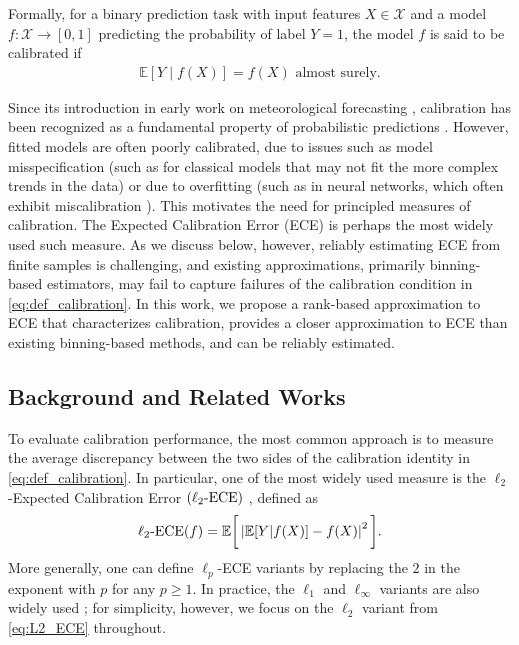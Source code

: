 \documentclass[11pt]{article}
\numberwithin{equation}{section}
\theoremstyle{definition}
\newcommand{\E}{\mathbb{E}}
\newcommand{\ECE}{\mathrm{ECE}}
\newcommand{\lECE}{\ell_2\textnormal{-}\ECE}
\begin{document}
Formally, for a binary prediction task with input features $X \in \mathcal{X}$ and a model $f:\mathcal{X} \rightarrow [0,1]$ predicting the probability of label $Y = 1$, the model $f$ is said to be calibrated if
\begin{align}\label{eq:def_calibration}
\mathbb{E}\left[Y \mid f(X)\right] = f(X)\text{ almost surely.}
\end{align}

Since its introduction in early work on meteorological forecasting \citep{glenn1950verification,degroot1983comparison}, calibration has been recognized as a fundamental property of probabilistic predictions \citep{hilden1978measurement,guo2017calibration,gneiting2014probabilistic,murphy1984probability,minderer2021revisiting}. However, fitted models are often poorly calibrated, due to issues such as model misspecification (such as for classical models that may not fit the more complex trends in the data) or due to overfitting (such as in neural networks, which often exhibit miscalibration \citep{guo2017calibration,ovadia2019,havasi2021training}). This motivates the need for principled measures of calibration. The Expected Calibration Error (ECE) is perhaps the most widely used such measure. As we discuss below, however, reliably estimating ECE from finite samples is challenging, and existing approximations, primarily binning-based estimators, may fail to capture failures of the calibration condition in \eqref{eq:def_calibration}. In this work, we propose a rank-based approximation to ECE that characterizes calibration, provides a closer approximation to ECE than existing binning-based methods, and can be reliably estimated.


\subsection{Background and Related Works}\label{sec:background}
To evaluate calibration performance, the most common approach is to measure the average discrepancy between the two sides of the calibration identity in \eqref{eq:def_calibration}. In particular, one of the most widely used measure is the $\ell_2$-Expected Calibration Error $(\lECE)$ \citep{murphy1973new,degroot1983comparison,hendrycks2019using,kumar2019verified,lee2023t,foster1998asymptotic, sun2024confidence}, defined as
\begin{align}\label{eq:L2_ECE}
\lECE(f) = \E\bigg[\left|\E[Y|f(X)] - f(X)\right|^2\bigg].
\end{align}
More generally, one can define $\ell_p$-ECE variants by replacing the $2$ in the exponent with $p$ for any $p \geq 1$. In practice, the $\ell_1$ and $\ell_\infty$ variants are also widely used \citep{guo2017calibration,naeini2015obtaining,nixon2019measuring,roelofs2022mitigating}; for simplicity, however, we focus on the $\ell_2$ variant from \eqref{eq:L2_ECE} throughout. 
\end{document}

